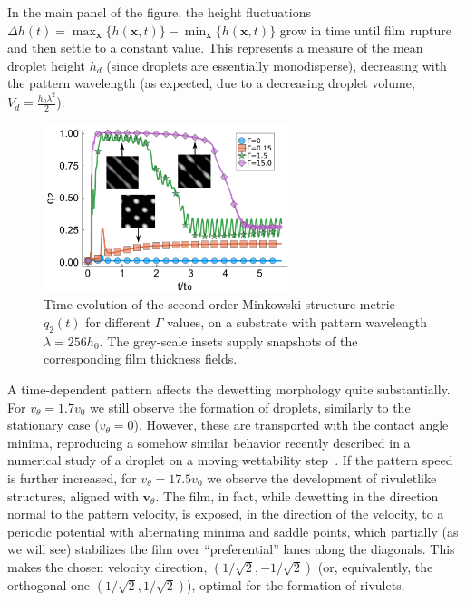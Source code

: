 In the main panel of the figure, the height fluctuations $\Delta h(t) = \max_{\mathbf{x}}\{h(\mathbf{x},t)\}-\min_{\mathbf{x}}\{h(\mathbf{x},t)\}$ grow in time until film rupture and then settle to a constant value. 
This represents a measure of the mean droplet height $h_d$ (since droplets are essentially monodisperse), decreasing with the pattern wavelength (as expected, due to a decreasing droplet volume, $V_d = \frac{h_0 \lambda^2}{2}$).
\begin{figure}
    \centering
    \includegraphics[width=0.65\textwidth]{graphics/Figure_4.pdf}
    \caption{Time evolution of the second-order Minkowski structure metric $q_2(t)$ for different $\Gamma$ values, on a substrate with pattern wavelength $\lambda=256 h_0$.
    The grey-scale insets supply snapshots of the corresponding film thickness fields.}
    \label{fig:msm_q2}
\end{figure}

A time-dependent pattern affects the dewetting morphology quite substantially.
For $v_{\theta} = 1.7 v_0$ we still observe the formation of droplets, similarly to the stationary case ($v_{\theta} = 0$). 
However, these are transported with the contact angle minima, reproducing a somehow similar behavior recently described in a numerical study of a droplet on a moving wettability step~\cite{grawitterSteeringDropletsSubstrates2021}.
If the pattern speed is further increased, for $v_{\theta} = 17.5 v_0$ we observe the development of rivuletlike structures, aligned with $\mathbf{v}_{\theta}$. 
The film, in fact, while dewetting in the direction normal to the pattern velocity, is exposed, in the direction of the velocity, to a periodic potential with alternating minima and saddle points, which partially (as we will see) stabilizes the film over ``preferential'' lanes along the diagonals. 
This makes the chosen velocity direction, $(1/\sqrt{2},-1/\sqrt{2})$ (or, equivalently, the orthogonal one $(1/\sqrt{2},1/\sqrt{2})$), optimal for the formation of rivulets. 

